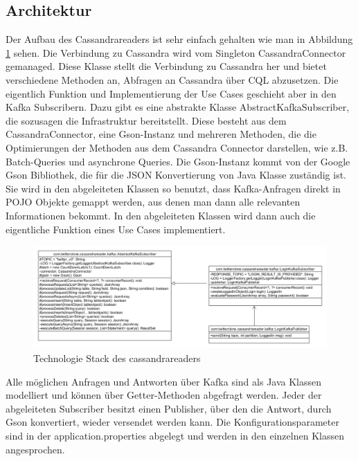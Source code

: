 \subsection{Architektur}
Der Aufbau des Cassandrareaders ist sehr einfach gehalten wie man in Abbildung \ref{fig:archCass} sehen. Die Verbindung zu Cassandra wird vom Singleton CassandraConnector gemanaged. Diese Klasse stellt die Verbindung zu Cassandra her und bietet verschiedene Methoden an, Abfragen an Cassandra über CQL abzusetzen. Die eigentlich Funktion und Implementierung der Use Cases geschieht aber in den Kafka Subscribern. Dazu gibt es eine abstrakte Klasse AbstractKafkaSubscriber, die sozusagen die Infrastruktur bereitstellt. Diese besteht aus dem CassandraConnector, eine Gson-Instanz und mehreren Methoden, die die Optimierungen der Methoden aus dem Cassandra Connector darstellen, wie z.B. Batch-Queries und asynchrone Queries. Die Gson-Instanz kommt von der Google Gson Bibliothek, die für die JSON Konvertierung von Java Klasse zuständig ist. Sie wird in den abgeleiteten Klassen so benutzt, dass Kafka-Anfragen direkt in POJO Objekte gemappt werden, aus denen man dann alle relevanten Informationen bekommt. In den abgeleiteten Klassen wird dann auch die eigentliche Funktion eines Use Cases implementiert.
\begin{figure}[htbp]
	\centering
	\includegraphics[scale=0.25, draft]{pics/cassandrareader_architecture.png}
	\caption{Technologie Stack des cassandrareaders}
	\label{fig:archCass}
\end{figure}
Alle möglichen Anfragen und Antworten über Kafka sind als Java Klassen modelliert und können über Getter-Methoden abgefragt werden. Jeder der abgeleiteten Subscriber besitzt einen Publisher, über den die Antwort, durch Gson konvertiert, wieder versendet werden kann. Die Konfigurationsparameter sind in der application.properties abgelegt und werden in den einzelnen Klassen angesprochen.


